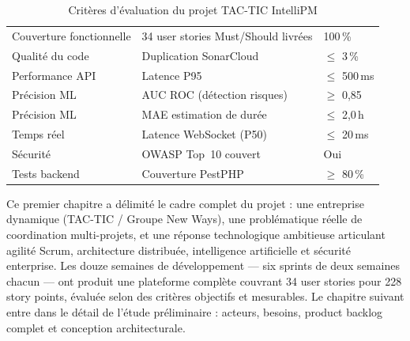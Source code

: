 \begin{table}[H]
  \centering
  \caption{Critères d'évaluation du projet TAC-TIC IntelliPM}
  \label{tab:criteres_eval}
  \begin{tabularx}{\textwidth}{L{4cm}X C{2.5cm}}
    \toprule
     &  &  \\
    \midrule
    Couverture fonctionnelle & 34 user stories Must/Should livrées & 100\,\% \\
    Qualité du code          & Duplication SonarCloud               & $\leq$ 3\,\% \\
    Performance API          & Latence P95                          & $\leq$ 500\,ms \\
    Précision ML             & AUC ROC (détection risques)          & $\geq$ 0,85 \\
    Précision ML             & MAE estimation de durée              & $\leq$ 2,0\,h \\
    Temps réel               & Latence WebSocket (P50)              & $\leq$ 20\,ms \\
    Sécurité                 & OWASP Top~10 couvert                 & Oui \\
    Tests backend            & Couverture PestPHP                   & $\geq$ 80\,\% \\
    \bottomrule
  \end{tabularx}
\end{table}

\begin{chapconclusion}
Ce premier chapitre a délimité le cadre complet du projet : une entreprise dynamique
(TAC-TIC / Groupe New Ways), une problématique réelle de coordination multi-projets,
et une réponse technologique ambitieuse articulant agilité Scrum, architecture
distribuée, intelligence artificielle et sécurité enterprise. Les douze semaines
de développement — six sprints de deux semaines chacun — ont produit une plateforme
complète couvrant 34 user stories pour 228 story points, évaluée selon des critères
objectifs et mesurables. Le chapitre suivant entre dans le détail de l'étude
préliminaire : acteurs, besoins, product backlog complet et conception architecturale.
\end{chapconclusion}
